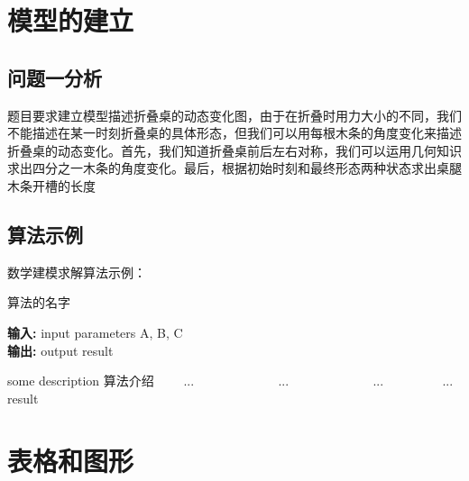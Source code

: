 \documentclass[bwprint,fontset=windows]{gmcmthesis}
\begin{document}


\section{模型的建立}

\subsection{问题一分析}
题目要求建立模型描述折叠桌的动态变化图，由于在折叠时用力大小的不同，我们不能描述在某一时刻折叠桌的具体形态，但我们可以用每根木条的角度变化来描述折叠桌的动态变化。首先，我们知道折叠桌前后左右对称，我们可以运用几何知识求出四分之一木条的角度变化。最后，根据初始时刻和最终形态两种状态求出桌腿木条开槽的长度


\subsection{算法示例}

数学建模求解算法示例：
\begin{center}
\begin{minipage}{0.8\textwidth}
\begin{algorithm}[H]%
\caption{算法的名字} %
{\bf 输入:} %
input parameters A, B, C\\
{\bf 输出:} %
output result
\begin{algorithmic}[1]
\State some description 算法介绍 %
　　\State ...
　　　　\State ...
　　\Else
　　　　\State ...
　　\EndIf
\EndFor
{} %
　　\State ...
\EndWhile
\State \Return result
\end{algorithmic}
\end{algorithm}
\end{minipage}
\end{center}
\vspace{2ex}

\section{表格和图形}
\end{document}
